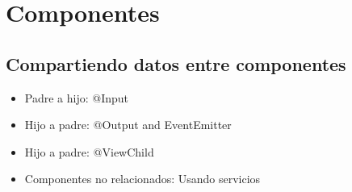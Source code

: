 \documentclass[12pt,article,oneside]{memoir}
\begin{document}
		\section{Componentes}
			\subsection{Compartiendo datos entre componentes}
				\begin{itemize}
					\item Padre a hijo: @Input
					\item Hijo a padre: @Output and EventEmitter
					\item Hijo a padre: @ViewChild
					\item Componentes no relacionados: Usando servicios
				\end{itemize}
	\newpage
	
\end{document}
